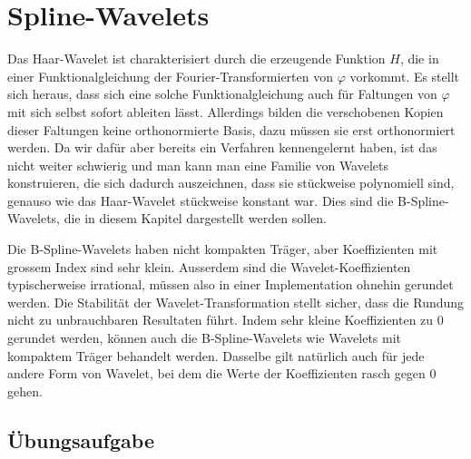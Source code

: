 %
%
%
\chapter{Spline-Wavelets
\label{chapter:spline}}
\rhead{}
Das Haar-Wavelet ist charakterisiert durch die erzeugende Funktion $H$,
die in einer Funktionalgleichung der Fourier-Transformierten von $\varphi$
vorkommt.
Es stellt sich heraus, dass sich eine solche Funktionalgleichung auch für 
Faltungen von $\varphi$ mit sich selbst sofort ableiten lässt.
Allerdings bilden die verschobenen Kopien dieser Faltungen keine
orthonormierte Basis, dazu müssen sie erst orthonormiert werden.
Da wir dafür aber bereits ein Verfahren kennengelernt haben, ist das nicht
weiter schwierig und man kann man eine Familie 
von Wavelets konstruieren, die sich dadurch auszeichnen, dass sie
stückweise polynomiell sind, genauso wie das Haar-Wavelet stückweise
konstant war.
Dies sind die B-Spline-Wavelets, die in diesem Kapitel dargestellt werden
sollen.

Die B-Spline-Wavelets haben nicht kompakten Träger, aber Koeffizienten
mit grossem Index sind sehr klein.
Ausserdem sind die Wavelet-Koeffizienten typischerweise irrational,
müssen also in einer Implementation ohnehin gerundet werden.
Die Stabilität der Wavelet-Transformation stellt sicher, dass die Rundung
nicht zu unbrauchbaren Resultaten führt.
Indem sehr kleine Koeffizienten zu $0$ gerundet werden, können auch die
B-Spline-Wavelets wie Wavelets mit kompaktem Träger behandelt werden.
Dasselbe gilt natürlich auch für jede andere Form von Wavelet, bei dem
die Werte der Koeffizienten rasch gegen $0$ gehen.





\section*{Übungsaufgabe}


